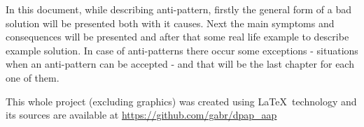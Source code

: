In this document, while describing anti-pattern, firstly the general form of a bad solution will be presented both with it causes. Next the main symptoms and consequences will be presented and after that some real life example to describe example solution.
In case of anti-patterns there occur some exceptions - situations when an anti-pattern can be accepted - and that will be the last chapter for each one of them.

\begin{bottompar}
This whole project (excluding graphics) was created using \LaTeX \ technology and its sources are available at \url{https://github.com/gabr/dpap_aap}

\ 
\end{bottompar}
